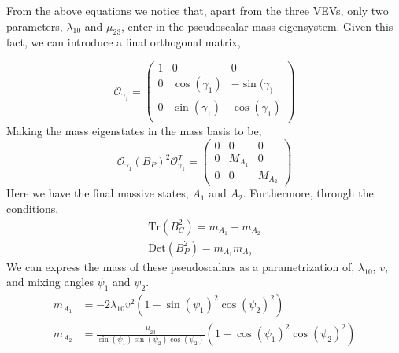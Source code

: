 %
From the above equations we notice that, apart from the three VEVs, only two parameters, $\lambda_{10}$ and $\mu_{23}$, enter in the pseudoscalar mass eigensystem. Given this fact, we can introduce a final orthogonal matrix,
%
\begin{comment}
From here we can use the relations, 
\begin{equation}
\mathrm{Tr} ( B_P^2 ) = m_{A_1} + m_{A_2}\quad , \quad  \mathrm{Det}( B_P^2 ) =  m_{A_1}  m_{A_2}
\end{equation}
to reach the mass for the two pseudo scalars as, 

{ \color{red} ?}
\end{comment} 
%
%
\begin{equation}
\mathcal{O}_{\gamma_1} = \begin{pmatrix}
1 & 0 & 0 \\
0 & \cos(\gamma_1) & -\sin(\gamma_) \\ 
0 & \sin(\gamma_1) & \cos(\gamma_1) \\
\end{pmatrix}
\end{equation}
Making the mass eigenstates in the mass basis to be, 
\begin{equation}
\mathcal{O}_{\gamma_1} \left( B_P \right)^2 \mathcal{O}_{\gamma_1}^T   = \begin{pmatrix}
0 & 0 & 0 \\ 
0 & M_{A_1} & 0 \\ 
0 & 0 & M_{A_2}
\end{pmatrix} 
\end{equation}
Here we have the final massive states,  $A_1$ and $A_2$. Furthermore, through the conditions, 
\begin{equation}
\begin{gathered}
\mathrm{Tr}(B_C^2) = m_{A_1} + m_{A_2}  \\
\mathrm{Det}( B_P^2 ) =  m_{A_1}  m_{A_2}
\end{gathered}
\end{equation} 
We can express the mass of these pseudoscalars as a parametrization of, $\lambda_{10}$, $v$, and mixing angles $\psi_1$ and $\psi_2$. 
\begin{equation}
\begin{split}
m_{A_1} & = - 2 \lambda_{10} v^2 \left( 1 - \sin(\psi_1)^2 \cos(\psi_2)^2 \right) \\ 
m_{A_2} & = \frac{\mu_23}{\sin(\psi_1)\sin(\psi_2)\cos(\psi_2)} \left( 1 - \cos(\psi_1)^2 \cos(\psi_2)^2 \right)
\end{split} 
\end{equation} 

